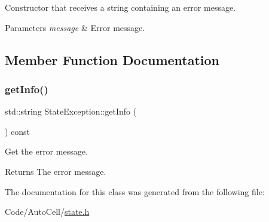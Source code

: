 Constructor that receives a string containing an error message.


\begin{DoxyParams}{Parameters}
{\em message} & Error message. \\
\hline
\end{DoxyParams}


\subsection{Member Function Documentation}
\mbox{\label{class_state_exception_a2d156f335c06c49eac67a76e854ec8dd}} 
\subsubsection{\texorpdfstring{get\+Info()}{getInfo()}}
{\footnotesize\ttfamily std\+::string State\+Exception\+::get\+Info (\begin{DoxyParamCaption}{ }\end{DoxyParamCaption}) const\hspace{0.3cm}{\ttfamily [inline]}}

Get the error message.

\begin{DoxyReturn}{Returns}
The error message. 
\end{DoxyReturn}


The documentation for this class was generated from the following file\+:\begin{DoxyCompactItemize}
\item 
Code/\+Auto\+Cell/\mbox{\hyperlink{state_8h}{state.\+h}}\end{DoxyCompactItemize}
